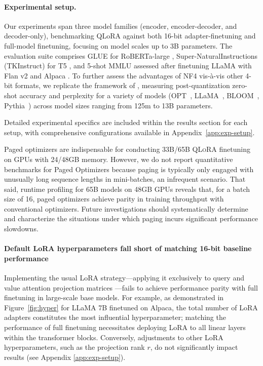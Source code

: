 \paragraph{Experimental setup.} Our experiments span three model families (encoder, encoder-decoder, and decoder-only), benchmarking QLoRA against both 16-bit adapter-finetuning and full-model finetuning, focusing on model scales up to 3B parameters. The evaluation suite comprises GLUE \citep{wang2018glue} for RoBERTa-large \citep{liu2019roberta}, Super-NaturalInstructions (TKInstruct) \citep{wang2022super} for T5 \citep{t5}, and 5-shot MMLU \citep{hendrycksmeasuring} assessed after finetuning LLaMA with Flan v2 \citep{longpre2023flan} and Alpaca \citep{alpaca}. To further assess the advantages of NF4 vis-à-vis other 4-bit formats, we replicate the framework of \citet{dettmers2022case}, measuring post-quantization zero-shot accuracy and perplexity for a variety of models (OPT~\citep{zhang2022opt}, LLaMA~\citep{touvron2023llama}, BLOOM~\citep{scao2022bloom}, Pythia~\citep{biderman2023pythia}) across model sizes ranging from 125m to 13B parameters.

Detailed experimental specifics are included within the results section for each setup, with comprehensive configurations available in Appendix~\ref{app:exp-setup}.

Paged optimizers are indispensable for conducting 33B/65B \textsc{QLoRA} finetuning on GPUs with 24/48GB memory. However, we do not report quantitative benchmarks for Paged Optimizers because paging is typically only engaged with unusually long sequence lengths in mini-batches, an infrequent scenario. That said, runtime profiling for 65B models on 48GB GPUs reveals that, for a batch size of 16, paged optimizers achieve parity in training throughput with conventional optimizers. Future investigations should systematically determine and characterize the situations under which paging incurs significant performance slowdowns.

\paragraph{Default LoRA hyperparameters fall short of matching 16-bit baseline performance}

Implementing the usual LoRA strategy—applying it exclusively to query and value attention projection matrices \citep{hu2021lora}—fails to achieve performance parity with full finetuning in large-scale base models. For example, as demonstrated in Figure~\ref{fig:hyper} for LLaMA 7B finetuned on Alpaca, the total number of LoRA adapters constitutes the most influential hyperparameter; matching the performance of full finetuning necessitates deploying LoRA to all linear layers within the transformer blocks. Conversely, adjustments to other LoRA hyperparameters, such as the projection rank $r$, do not significantly impact results (see Appendix \ref{app:exp-setup}).


